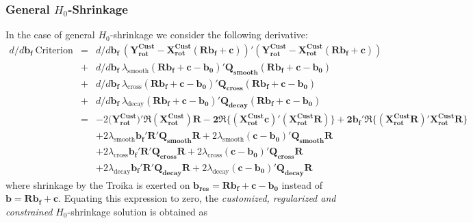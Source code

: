 \documentclass[11pt]{article}
\begin{document}
\subsubsection{General $H_0$-Shrinkage}\label{h_0_const}

In the case of general $H_0$-shrinkage we consider the following derivative: 
\begin{eqnarray*}
d/d\mathbf{b_f}~\textrm{Criterion}&=&d/d\mathbf{b_f}~(\mathbf{Y_{\textrm{rot}}^{\textrm{Cust}}-X_{\textrm{rot}}^{\textrm{Cust}}\left(\mathbf{R b_{f}}+\mathbf{c}\right)})'(\mathbf{Y_{\textrm{rot}}^{\textrm{Cust}}-X_{\textrm{rot}}^{\textrm{Cust}}\left(\mathbf{R b_{f}}+\mathbf{c}\right)})\nonumber\\
&+&d/d\mathbf{b_f}~\lambda_{\textrm{smooth}}\mathbf{\left(\mathbf{R b_{f}}+\mathbf{c-b_0}\right)'Q_{smooth}\left(\mathbf{R b_{f}}+\mathbf{c-b_0}\right)}\\
&+&d/d\mathbf{b_f}~\lambda_{\textrm{cross}}\mathbf{\left(\mathbf{R b_{f}}+\mathbf{c-b_0}\right)'Q_{cross}\left(\mathbf{R b_{f}}+\mathbf{c-b_0}\right)}\\
&+&d/d\mathbf{b_f}~\lambda_{\textrm{decay}}\mathbf{\left(\mathbf{R b_{f}}+\mathbf{c-b_0}\right)'Q_{decay}\left(\mathbf{R b_{f}}+\mathbf{c-b_0}\right)}\\
&=&-2(\mathbf{Y_{\textrm{rot}}^{\textrm{Cust}})'\Re\left(X_{\textrm{rot}}^{\textrm{Cust}}\right)R-
2\Re\bigg\{\mathbf{(X_{\textrm{rot}}^{\textrm{Cust}}c)'(X_{\textrm{rot}}^{\textrm{Cust}}R)}\bigg\}
+2b_f'\Re\bigg\{(X_{\textrm{rot}}^{\textrm{Cust}}R)'X_{\textrm{rot}}^{\textrm{Cust}}R\bigg\}}\\
&&+2\lambda_{\textrm{smooth}}\mathbf{b_f'R'Q_{smooth}R}+2\lambda_{\textrm{smooth}}\mathbf{(c-b_0)'Q_{\textrm{smooth}}R}\\
&&+2\lambda_{\textrm{cross}}\mathbf{b_f'R'Q_{cross}R}+2\lambda_{\textrm{cross}}\mathbf{(c-b_0)'Q_{\textrm{cross}}R}\\
&&+2\lambda_{\textrm{decay}}\mathbf{b_f'R'Q_{decay}R}+2\lambda_{\textrm{decay}}\mathbf{(c-b_0)'Q_{\textrm{decay}}R}
\end{eqnarray*}
where shrinkage by the Troika is exerted on $\mathbf{b_{\textrm{res}}=R b_{f}}+\mathbf{c-b_0}$ instead of $\mathbf{b=R b_{f}}+\mathbf{c}$. Equating this expression to zero, the \emph{customized, regularized and constrained } $H_0$-shrinkage solution is obtained as
\end{document}
